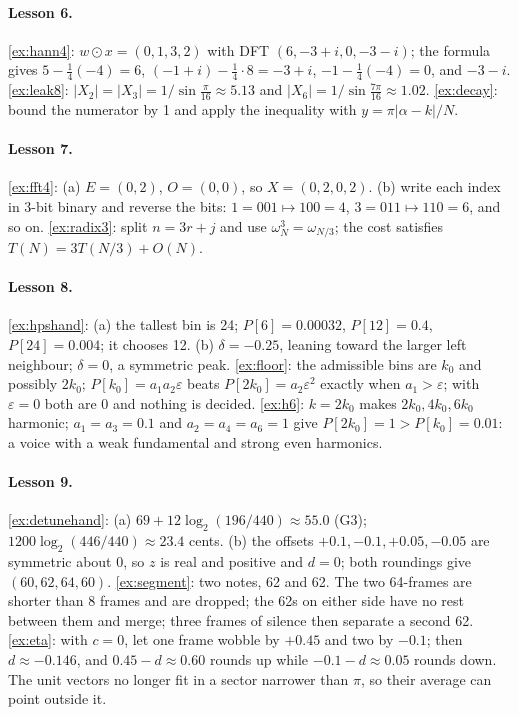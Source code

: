 \documentclass[11pt]{article}
\theoremstyle{definition}
\newcommand{\abs}[1]{\lvert #1\rvert}
\begin{document}
\paragraph{Lesson 6.} \ref{ex:hann4}: $w\odot x=(0,1,3,2)$ with DFT
$(6,-3+i,0,-3-i)$; the formula gives $5-\frac14(-4)=6$,
$(-1+i)-\frac14\cdot8=-3+i$, $-1-\frac14(-4)=0$, and $-3-i$.
\ref{ex:leak8}: $\abs{X_2}=\abs{X_3}=1/\sin\frac\pi{16}\approx5.13$ and
$\abs{X_6}=1/\sin\frac{7\pi}{16}\approx1.02$. \ref{ex:decay}: bound the numerator by
1 and apply the inequality with $y=\pi\abs{\alpha-k}/N$.

\paragraph{Lesson 7.} \ref{ex:fft4}: (a) $E=(0,2)$, $O=(0,0)$, so $X=(0,2,0,2)$.
(b) write each index in 3-bit binary and reverse the bits: $1=001\mapsto100=4$,
$3=011\mapsto110=6$, and so on. \ref{ex:radix3}: split $n=3r+j$ and use
$\omega_N^3=\omega_{N/3}$; the cost satisfies $T(N)=3T(N/3)+O(N)$.

\paragraph{Lesson 8.} \ref{ex:hpshand}: (a) the tallest bin is 24; $P[6]=0.00032$,
$P[12]=0.4$, $P[24]=0.004$; it chooses 12. (b) $\delta=-0.25$, leaning toward the
larger left neighbour; $\delta=0$, a symmetric peak. \ref{ex:floor}: the admissible
bins are $k_0$ and possibly $2k_0$; $P[k_0]=a_1a_2\varepsilon$ beats
$P[2k_0]=a_2\varepsilon^2$ exactly when $a_1>\varepsilon$; with $\varepsilon=0$ both
are 0 and nothing is decided. \ref{ex:h6}: $k=2k_0$ makes $2k_0,4k_0,6k_0$ harmonic;
$a_1=a_3=0.1$ and $a_2=a_4=a_6=1$ give $P[2k_0]=1>P[k_0]=0.01$: a voice with a weak
fundamental and strong even harmonics.

\paragraph{Lesson 9.} \ref{ex:detunehand}: (a) $69+12\log_2(196/440)\approx55.0$ (G3);
$1200\log_2(446/440)\approx23.4$ cents. (b) the offsets $+0.1,-0.1,+0.05,-0.05$ are
symmetric about 0, so $z$ is real and positive and $d=0$; both roundings give
$(60,62,64,60)$. \ref{ex:segment}: two notes, 62 and 62. The two 64-frames are shorter
than 8 frames and are dropped; the 62s on either side have no rest between them and
merge; three frames of silence then separate a second 62. \ref{ex:eta}: with $c=0$, let
one frame wobble by $+0.45$ and two by $-0.1$; then $d\approx-0.146$, and
$0.45-d\approx0.60$ rounds up while $-0.1-d\approx0.05$ rounds down. The unit vectors
no longer fit in a sector narrower than $\pi$, so their average can point outside it.
\end{document}
